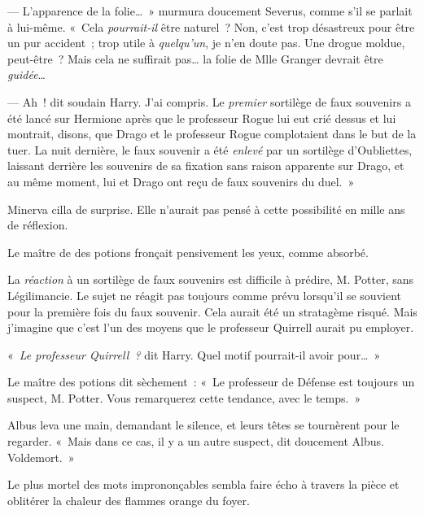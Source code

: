 --- L'apparence de la folie…~» murmura doucement Severus, comme s'il se parlait à lui-même. «~Cela \emph{pourrait-il} être naturel~? Non, c'est trop désastreux pour être un pur accident~; trop utile à \emph{quelqu'un}, je n'en doute pas. Une drogue moldue, peut-être~? Mais cela ne suffirait pas… la folie de Mlle Granger devrait être \emph{guidée}…

--- Ah~! dit soudain Harry. J'ai compris. Le \emph{premier} sortilège de faux souvenirs a été lancé sur Hermione après que le professeur Rogue lui eut crié dessus et lui montrait, disons, que Drago et le professeur Rogue complotaient dans le but de la tuer. La nuit dernière, le faux souvenir a été \emph{enlevé} par un sortilège d'Oubliettes, laissant derrière les souvenirs de sa fixation sans raison apparente sur Drago, et au même moment, lui et Drago ont reçu de faux souvenirs du duel.~»

Minerva cilla de surprise. Elle n'aurait pas pensé à cette possibilité en mille ans de réflexion.

Le maître de des potions fronçait pensivement les yeux, comme absorbé.

La \emph{réaction} à un sortilège de faux souvenirs est difficile à prédire, M. Potter, sans Légilimancie. Le sujet ne réagit pas toujours comme prévu lorsqu'il se souvient pour la première fois du faux souvenir. Cela aurait été un stratagème risqué. Mais j'imagine que c'est l'un des moyens que le professeur Quirrell aurait pu employer.

«~\emph{Le professeur Quirrell~?} dit Harry. Quel motif pourrait-il avoir pour…~»

Le maître des potions dit sèchement~: «~Le professeur de Défense est toujours un suspect, M. Potter. Vous remarquerez cette tendance, avec le temps.~»

Albus leva une main, demandant le silence, et leurs têtes se tournèrent pour le regarder. «~Mais dans ce cas, il y a un autre suspect, dit doucement Albus. Voldemort.~»

Le plus mortel des mots imprononçables sembla faire écho à travers la pièce et oblitérer la chaleur des flammes orange du foyer.

